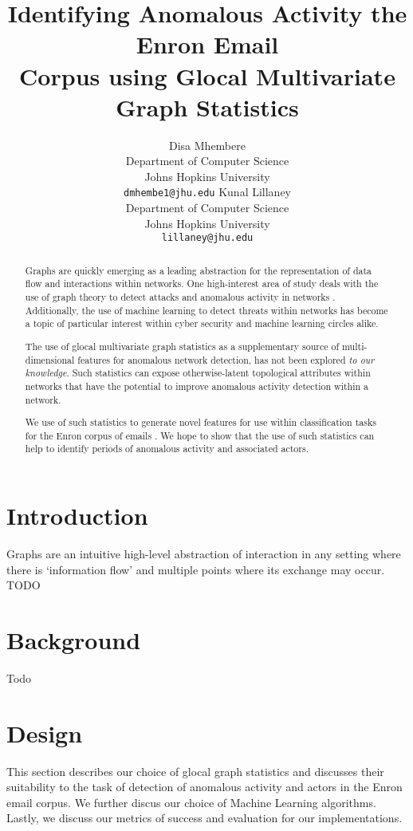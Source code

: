 \documentclass[11pt,letterpaper]{article}
\title{Identifying Anomalous Activity the Enron Email \\
				Corpus using Glocal Multivariate Graph Statistics}
\author{Disa Mhembere\\
  Department of Computer Science\\
  Johns Hopkins University\\
  {\tt dmhembe1@jhu.edu}
  \And
  Kunal Lillaney \\
  Department of Computer Science\\
  Johns Hopkins University\\
  {\tt lillaney@jhu.edu}}
\date{}
\begin{document}
\maketitle
\begin{abstract}
Graphs are quickly emerging as a leading abstraction for the representation of data
flow and interactions within networks. One high-interest area of study deals with 
the use of graph theory to detect attacks and anomalous activity in networks 
\cite{priebe2005scan,park2009anomaly,park2013anomaly}.
Additionally, the use of machine learning to detect threats within networks 
has become a topic of particular interest 
\cite{mahoney2003machine,shon2005machine,sommer2010outside,shon2007hybrid} within
cyber security and machine learning circles alike.

The use of glocal multivariate graph statistics \cite{mhembere2013computing} as 
a supplementary source of multi-dimensional features for anomalous network detection,
has not been explored \textit{to our knowledge}. Such statistics can expose 
otherwise-latent topological attributes within networks that have the potential 
to improve anomalous activity detection within a network.

We use of such statistics to generate novel features for use within
classification tasks for the Enron corpus of emails \cite{enronrepo2009}.
We hope to show that the use of such statistics can help to identify periods of
anomalous activity and associated actors.
\end{abstract}


\section{Introduction}
Graphs are an intuitive high-level abstraction of interaction in any setting where
there is `information flow' and multiple points where its exchange may occur. TODO

\section{Background}
Todo

\section{Design}
This section describes our choice of glocal graph statistics and discusses their suitability
to the task of detection of anomalous activity and actors in the Enron email corpus.
We further discus our choice of Machine Learning algorithms. Lastly, we discuss our metrics
of success and evaluation for our implementations.
\end{document}

